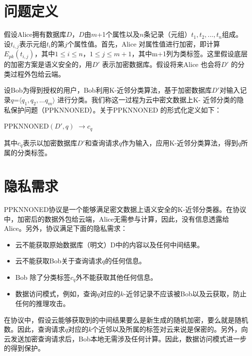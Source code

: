 \section{问题定义}
假设Alice拥有数据库$D$，$D$由$m$+1个属性以及$n$条记录（元组）$t_1,t_2,...,t_n$组成。设$t_{i,j}$表示元组$t_i$的第$j$个属性值。首先，Alice 对属性值进行加密，即计算$E_{pk}(t_{i,j})$，其中$1\leq i \leq n$，$1\leq j \leq m+1$，其中m+1列为类标签。这里假设底层的加密方案是语义安全的，用${D}'$ 表示加密数据库。假设将来Alice 也会将${D}'$ 的分类过程外包给云端。

设Bob为得到授权的用户，Bob利用K-近邻分类算法，基于加密数据库${D}'$对输入记录$q$=$\langle q_1,q_2,...q_m \rangle$ 进行分类。我们称这一过程为云中密文数据上K- 近邻分类的隐私保护问题（PPKNNONED）。关于PPKNNONED 的形式化定义如下：
\begin{center}
PPKNNONED$({D}',q)$ $\rightarrow c_q$
\end{center}
其中$c_q$表示以加密数据库${D}'$和查询请求$q$作为输入，应用K-近邻分类算法，得到$q$所属的分类标签。

\section{隐私需求}
PPKNNONED协议是一个能够满足密文数据上语义安全的K-近邻分类器。在协议中，加密后的数据外包给云端，Alice无需参与计算，因此，没有信息透露给Alice。另外，协议满足下面的隐私需求：
\begin{itemize}
\item 云不能获取原始数据库（明文）D中的内容以及任何中间结果。
\item 云不能获取Bob关于查询请求$q$的任何信息。
\item Bob 除了分类标签$c_q$外不能获取其他任何信息。
\item 数据访问模式，例如，查询$q$对应的$k$-近邻记录不应该被Bob以及云获取，防止任何的推理攻击。
\end{itemize}
在协议中，假设云能够获取到的中间结果要么是新生成的随机加密，要么就是随机数。因此，查询请求$q$对应的$k$个近邻以及所属的标签对云来说是保密的。另外，向云发送加密查询请求后，Bob本地无需涉及任何计算。因此，数据访问模式进一步的得到保护。

